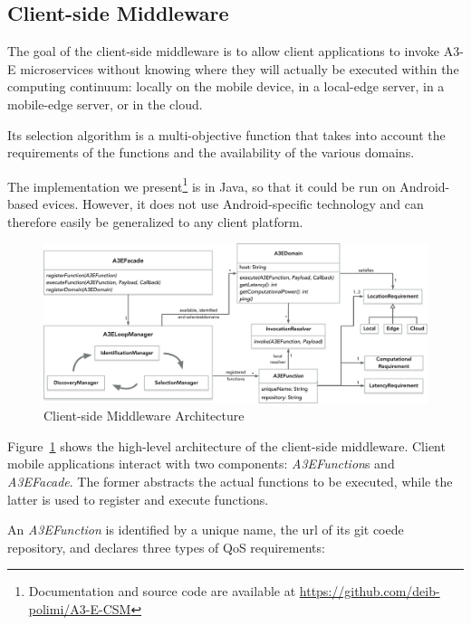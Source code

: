 \subsection{Client-side Middleware}


The goal of the client-side middleware is to allow client applications to invoke A3-E microservices without knowing where they will actually be executed within the computing continuum: locally on the mobile device, in a local-edge server, in a mobile-edge server, or in the cloud. 

Its selection algorithm is a multi-objective function that takes into account the requirements of the functions and the availability of the various domains. 

The implementation we present\footnote{Documentation and source code are available at \url{https://github.com/deib-polimi/A3-E-CSM}} is in Java, so that it could be run on Android-based evices. However, it does not use Android-specific technology and can therefore easily be generalized to any client platform. 

\begin{figure}[tbp]
	\includegraphics[width=1\textwidth]{figs/a3e-mobile-prototype}
	\caption{Client-side Middleware Architecture}
	\label{fig:mobile-prototype}
\end{figure}

Figure~\ref{fig:mobile-prototype} shows the high-level architecture of the client-side middleware. Client mobile applications interact with two components: \textit{A3EFunction}s and \textit{A3EFacade}. The former abstracts the actual functions to be executed, while the latter is used to register and execute functions. 

An \textit{A3EFunction} is identified by a unique name, the url of its git coede repository, and declares three types of QoS requirements: 

